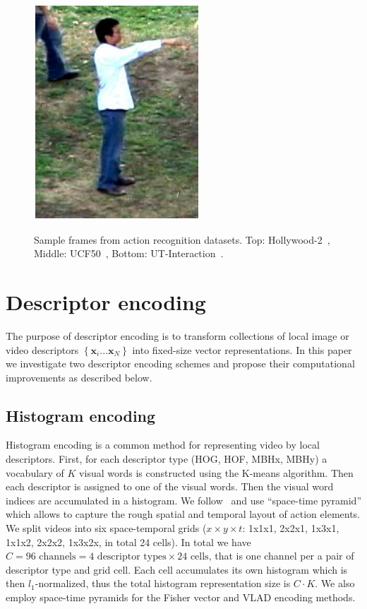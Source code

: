 \documentclass[10pt,twocolumn,letterpaper]{article}
\begin{document}
\begin{figure}[!t]
\begin{center}
\includegraphics[scale=0.4]{figures/dataset_thumb/uti/crop_class6.pdf} \\
\smallskip
\caption{Sample frames from action recognition datasets. Top: Hollywood-2~\cite{Marszalek09}, Middle: UCF50~\cite{Reddy12}, Bottom: UT-Interaction~\cite{Ryoo10}.\vspace{-.5cm}}
\label{fig:datasets}
\end{center}
\end{figure}




\section{Descriptor encoding}
\label{sec:quantization}
The purpose of descriptor encoding is to transform collections of local image or video descriptors $\left\{\textbf{x}_i\dots\textbf{x}_N\right\}$ into fixed-size vector representations.
In this paper we investigate two descriptor encoding schemes and propose their computational improvements as described below.

\subsection{Histogram encoding}
\label{subsec:histenc}
Histogram encoding is a common method for representing video by local descriptors. First, for each descriptor type (HOG, HOF, MBHx, MBHy) a vocabulary of $K$ visual words is constructed using the K-means algorithm. Then each descriptor is assigned to one of the visual words. Then the visual word indices are accumulated in a histogram. We follow~\cite{Laptev08} and use ``space-time pyramid'' which allows to capture the rough spatial and temporal layout of action elements. We split videos into six space-temporal grids ($x\times y \times t$: 1x1x1, 2x2x1, 1x3x1, 1x1x2, 2x2x2, 1x3x2x, in total 24 cells). In total we have $C=96\text{ channels} = 4 \text{ descriptor types}\times 24\text{ cells}$, that is one channel per a pair of descriptor type and grid cell. Each cell accumulates its own histogram which is then $l_1$-normalized, thus the total histogram representation size is $C\cdot K$. We also employ space-time pyramids for the Fisher vector and VLAD encoding methods.
\end{document}
